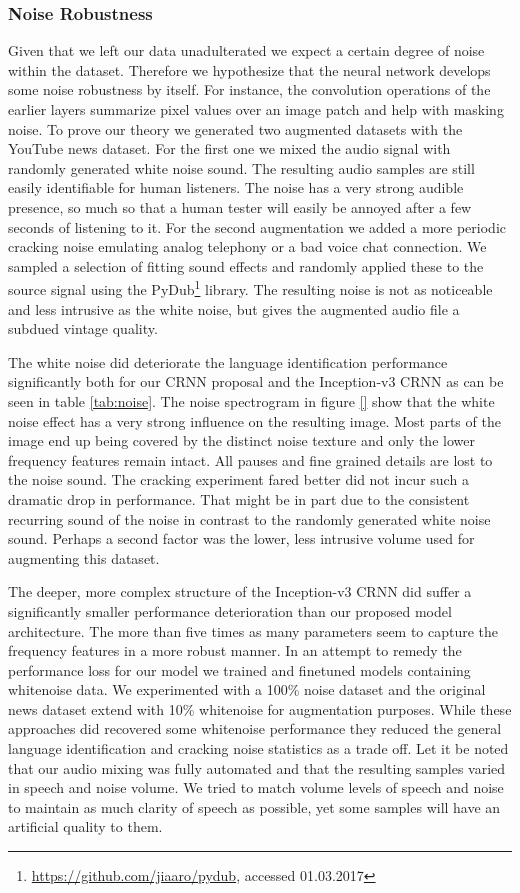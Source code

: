 \subsubsection{Noise Robustness} 
\label{sec:noise_robustness}
Given that we left our data unadulterated we expect a certain degree of noise within the dataset. Therefore we hypothesize that the neural network develops some noise robustness by itself. For instance, the convolution operations of the earlier layers summarize pixel values over an image patch and help with masking noise. To prove our theory we generated two augmented datasets with the YouTube news dataset. 
For the first one we mixed the audio signal with randomly generated white noise sound. The resulting audio samples are still easily identifiable for human listeners. The noise has a very strong audible presence, so much so that a human tester will easily be annoyed after a few seconds of listening to it.
For the second augmentation we added a more periodic cracking noise emulating analog telephony or a bad voice chat connection. We sampled a selection of fitting sound effects and randomly applied these to the source signal using the PyDub\footnote{\url{https://github.com/jiaaro/pydub}, accessed 01.03.2017} library. The resulting noise is not as noticeable and less intrusive as the white noise, but gives the augmented audio file a subdued vintage quality.

The white noise did deteriorate the language identification performance significantly both for our CRNN proposal and the Inception-v3 CRNN as can be seen in table \ref{tab:noise}. The noise spectrogram in figure \ref{} show that the white noise effect has a very strong influence on the resulting image. Most parts of the image end up being covered by the distinct noise texture and only the lower frequency features remain intact. All pauses and fine grained details are lost to the noise sound. 
The cracking experiment fared better did not incur such a dramatic drop in performance. That might be in part due to the consistent recurring sound of the noise in contrast to the randomly generated white noise sound. Perhaps a second factor was the lower, less intrusive volume used for augmenting this dataset.

The deeper, more complex structure of the Inception-v3 CRNN did suffer a significantly smaller performance deterioration than our proposed model architecture. The more than five times as many parameters seem to capture the frequency features in a more robust manner.  In an attempt  to remedy the performance loss for our model we trained and finetuned models containing whitenoise data. We experimented with a 100\% noise dataset and the original news dataset extend with 10\% whitenoise for augmentation purposes. While these approaches did recovered some whitenoise performance they reduced the general language identification and cracking noise statistics as a trade off.
Let it be noted that our audio mixing was fully automated and that the resulting samples varied in   speech and noise volume. We tried to match volume levels of speech and noise to maintain as much clarity of speech as possible, yet some samples will have an artificial quality to them.

